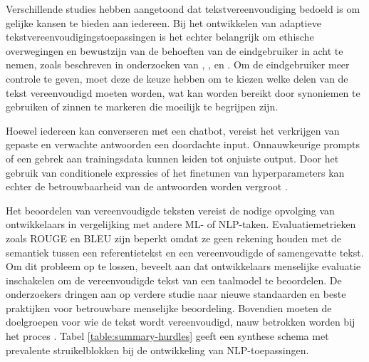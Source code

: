 \medspace

Verschillende studies hebben aangetoond dat tekstvereenvoudiging bedoeld is om gelijke kansen te bieden aan iedereen. Bij het ontwikkelen van adaptieve tekstvereenvoudigingstoepassingen is het echter belangrijk om ethische overwegingen en bewustzijn van de behoeften van de eindgebruiker in acht te nemen, zoals beschreven in onderzoeken van \textcite{Niemeijer2010}, \textcite{Xu2015}, en \textcite{Gooding2022}. Om de eindgebruiker meer controle te geven, moet deze de keuze hebben om te kiezen welke delen van de tekst vereenvoudigd moeten worden, wat kan worden bereikt door synoniemen te gebruiken of zinnen te markeren die moeilijk te begrijpen zijn.

\medspace

Hoewel iedereen kan converseren met een chatbot, vereist het verkrijgen van gepaste en verwachte antwoorden een doordachte input. Onnauwkeurige prompts of een gebrek aan trainingsdata kunnen leiden tot onjuiste output. Door het gebruik van conditionele expressies of het finetunen van hyperparameters kan echter de betrouwbaarheid van de antwoorden worden vergroot \autocite{Miszczak2023, Jiang2023}.

\medspace

Het beoordelen van vereenvoudigde teksten vereist de nodige opvolging van ontwikkelaars in vergelijking met andere ML- of NLP-taken. Evaluatiemetrieken zoals ROUGE en BLEU zijn beperkt omdat ze geen rekening houden met de semantiek tussen een referentietekst en een vereenvoudigde of samengevatte tekst. Om dit probleem op te lossen, beveelt \textcite{Fabbri2020} aan dat ontwikkelaars menselijke evaluatie inschakelen om de vereenvoudigde tekst van een taalmodel te beoordelen. De onderzoekers dringen aan op verdere studie naar nieuwe standaarden en beste praktijken voor betrouwbare menselijke beoordeling. Bovendien moeten de doelgroepen voor wie de tekst wordt vereenvoudigd, nauw betrokken worden bij het proces \autocite{Iskender2021}. Tabel \ref{table:summary-hurdles} geeft een synthese schema met prevalente struikelblokken bij de ontwikkeling van NLP-toepassingen.

\medspace

